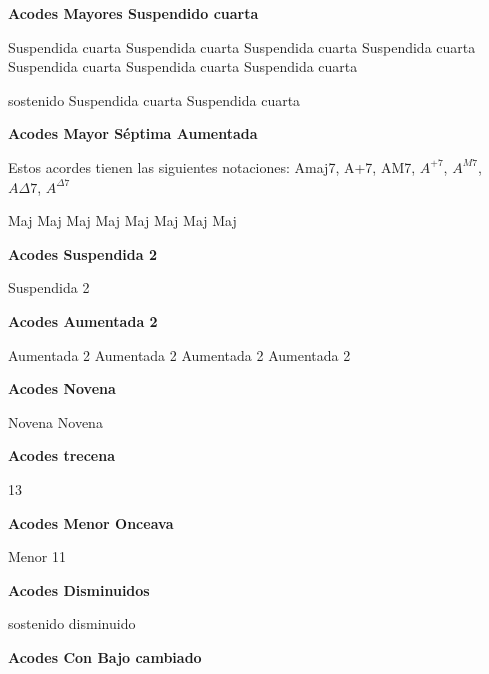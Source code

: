 \vskip 20pt
\textbf{Acodes Mayores Suspendido cuarta}
\vskip 25pt

\small
{} Suspendida cuarta
 Suspendida cuarta
 Suspendida cuarta
 Suspendida cuarta
 Suspendida cuarta
 Suspendida cuarta
 Suspendida cuarta

 sostenido Suspendida cuarta
 Suspendida cuarta
\normalsize

\vskip 20pt
\textbf{Acodes Mayor S\'eptima Aumentada}
\vskip 25pt

Estos acordes tienen las siguientes notaciones:
Amaj7, A+7, AM7, $A^{+7}$, $A^{M7}$, $A\Delta7$, $A^{\Delta7}$\break
\vskip 20pt

\small
{} Maj
 Maj
 Maj
 Maj
 Maj
 Maj
 Maj
 Maj
\normalsize

\vskip 20pt
\textbf{Acodes Suspendida 2}
\vskip 25pt

\small
{} Suspendida 2
\normalsize

\vskip 20pt
\textbf{Acodes Aumentada 2}
\vskip 25pt

\small
{} Aumentada 2
 Aumentada 2
 Aumentada 2
 Aumentada 2
\normalsize

\vskip 20pt
\textbf{Acodes Novena}
\vskip 25pt

\small
{} Novena
 Novena
\normalsize

\vskip 20pt
\textbf{Acodes trecena}
\vskip 25pt

\small
{} 13
\normalsize

\vskip 20pt
\textbf{Acodes Menor Onceava}
\vskip 25pt

\small
{} Menor 11
\normalsize

\vskip 20pt
\textbf{Acodes Disminuidos}
\vskip 25pt

\small
{} sostenido disminuido
\normalsize


\vskip 20pt
\textbf{Acodes Con Bajo cambiado}

